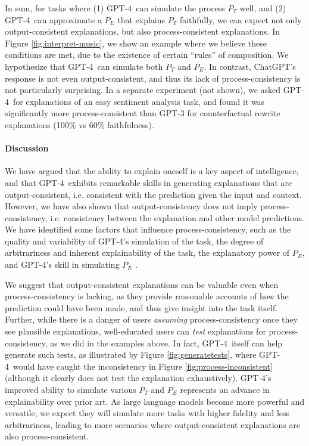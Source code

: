 In sum, for tasks where (1) GPT-4\ can simulate the process $P_T$ well, and (2) GPT-4\ can approximate a $P_E$ that explains $P_T$ faithfully, we can expect not only output-consistent explanations, but also process-consistent explanations. In Figure \ref{fig:interpret-music}, we show an example where we believe these conditions are met, due to the existence of certain ``rules'' of composition. We hypothesize that GPT-4\ can simulate both $P_T$ and $P_E$. In contrast, ChatGPT's response is not even output-consistent, and thus its lack of process-consistency is not particularly surprising. In a separate experiment (not shown), we asked GPT-4\ for explanations of an easy sentiment analysis task, and found it was significantly more process-consistent than GPT-3 for counterfactual rewrite explanations (100\% vs 60\% faithfulness).

\paragraph{Discussion}
We have argued that the ability to explain oneself is a key aspect of intelligence, and that GPT-4\ exhibits remarkable skills in generating explanations that are output-consistent, i.e. consistent with the prediction given the input and context. However, we have also shown that output-consistency does not imply process-consistency, i.e. consistency between the explanation and other model predictions. We have identified some factors that influence process-consistency, such as the quality and variability of GPT-4's simulation of the task, the degree of arbitrariness and inherent explainability of the task, the explanatory power of $P_E$, and GPT-4's skill in simulating $P_E$ .

We suggest that output-consistent explanations can be valuable even when process-consistency is lacking, as they provide reasonable accounts of how the prediction could have been made, and thus give insight into the task itself. Further, while there is a danger of users \emph{assuming} process-consistency once they see plausible explanations, well-educated users can \emph{test} explanations for process-consistency, as we did in the examples above. In fact, GPT-4\ itself can help generate such tests, as illustrated by Figure \ref{fig:generatetests}, where GPT-4\ would have caught the inconsistency in Figure \ref{fig:process-inconsistent} (although it clearly does not test the explanation exhaustively). {GPT-4}'s improved ability to simulate various $P_T$ and $P_E$ represents an advance in explainability over prior art. As large language models become more powerful and versatile, we expect they will simulate more tasks with higher fidelity and less arbitrariness, leading to more scenarios where output-consistent explanations are also process-consistent.

